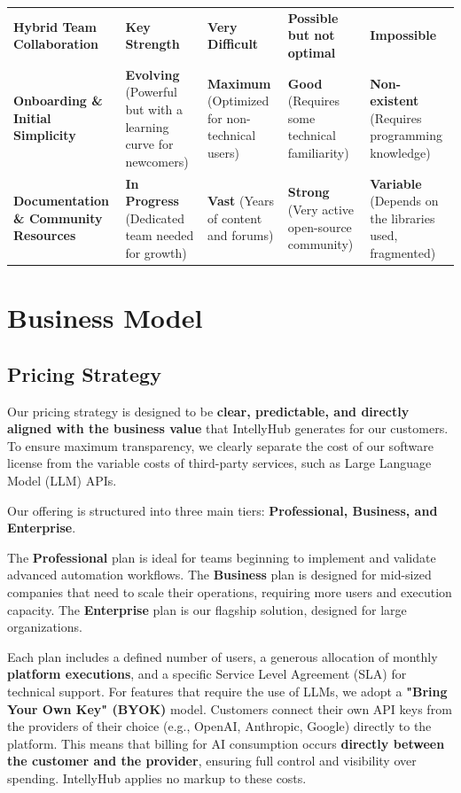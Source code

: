 \documentclass[11pt, a4paper, oneside]{article}
\begin{document}
\begin{table}[H]
{\begin{tabularx}{1.2\textwidth}{lLLLL}
\addlinespace
\textbf{Hybrid Team Collaboration} & \textbf{Key Strength} & \textbf{Very Difficult} & \textbf{Possible but not optimal} & \textbf{Impossible} \\
\addlinespace
\textbf{Onboarding \& Initial Simplicity} & \textbf{Evolving} (Powerful but with a learning curve for newcomers) & \textbf{Maximum} (Optimized for non-technical users) & \textbf{Good} (Requires some technical familiarity) & \textbf{Non-existent} (Requires programming knowledge) \\
\addlinespace
\textbf{Documentation \& Community Resources} & \textbf{In Progress} (Dedicated team needed for growth) & \textbf{Vast} (Years of content and forums) & \textbf{Strong} (Very active open-source community) & \textbf{Variable} (Depends on the libraries used, fragmented) \\
\bottomrule
\end{tabularx}%
}
\end{table}

\section{Business Model}
\subsection{Pricing Strategy}

Our pricing strategy is designed to be \textbf{clear, predictable, and directly aligned with the business value} that IntellyHub generates for our customers. To ensure maximum transparency, we clearly separate the cost of our software license from the variable costs of third-party services, such as Large Language Model (LLM) APIs.

Our offering is structured into three main tiers: \textbf{Professional, Business, and Enterprise}.

The \textbf{Professional} plan is ideal for teams beginning to implement and validate advanced automation workflows. The \textbf{Business} plan is designed for mid-sized companies that need to scale their operations, requiring more users and execution capacity. The \textbf{Enterprise} plan is our flagship solution, designed for large organizations.

Each plan includes a defined number of users, a generous allocation of monthly \textbf{platform executions}, and a specific Service Level Agreement (SLA) for technical support. For features that require the use of LLMs, we adopt a \textbf{"Bring Your Own Key" (BYOK)} model. Customers connect their own API keys from the providers of their choice (e.g., OpenAI, Anthropic, Google) directly to the platform. This means that billing for AI consumption occurs \textbf{directly between the customer and the provider}, ensuring full control and visibility over spending. IntellyHub applies no markup to these costs.
\end{document}
